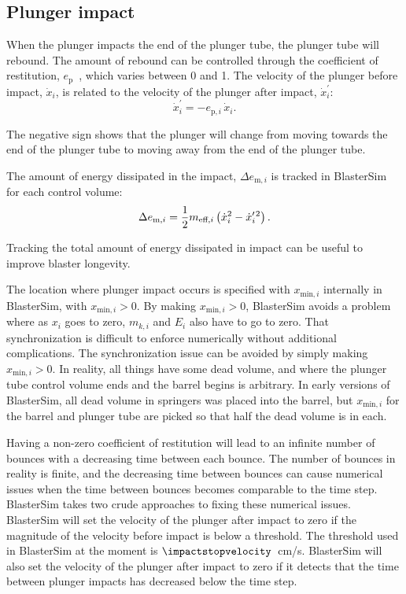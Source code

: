 \subsection{Plunger impact}\label{plunger-impact}

When the plunger impacts the end of the plunger tube, the plunger tube will rebound.
The amount of rebound can be controlled through the coefficient of restitution, $e_\text{p}$~\citep[pp.~524--525]{beer_vector_1962-1}, which varies between 0 and 1.
The velocity of the plunger before impact, $\dot{x}_i$, is related to the velocity of the plunger after impact, $\dot{x}_i^\prime$:
\begin{equation}
    \dot{x}_i^\prime = -e_{\text{p},i}\,\dot{x}_i.
\end{equation}

The negative sign shows that the plunger will change from moving towards the end of the plunger tube to moving away from the end of the plunger tube.

The amount of energy dissipated in the impact, $\Delta e_{\text{m},i}$ is tracked in BlasterSim for each control volume:
\begin{equation}
    \Delta e_{\text{m},i} = \frac{1}{2} m_{\text{eff},i} \left(\dot{x}_i^2 - \dot{x}_i^{\prime\kern1pt2}\right).
\end{equation}

Tracking the total amount of energy dissipated in impact can be useful to improve blaster longevity.

The location where plunger impact occurs is specified with $x_{\text{min},i}$ internally in BlasterSim, with $x_{\text{min},i} > 0$.
By making $x_{\text{min},i} > 0$, BlasterSim avoids a problem where as $x_i$ goes to zero, $m_{k,i}$ and $E_i$ also have to go to zero.
That synchronization is difficult to enforce numerically without additional complications.
The synchronization issue can be avoided by simply making $x_{\text{min},i} > 0$.
In reality, all things have some dead volume, and where the plunger tube control volume ends and the barrel begins is arbitrary.
In early versions of BlasterSim, all dead volume in springers was placed into the barrel, but $x_{\text{min},i}$ for the barrel and plunger tube are picked so that half the dead volume is in each.

Having a non-zero coefficient of restitution will lead to an infinite number of bounces with a decreasing time between each bounce.
The number of bounces in reality is finite, and the decreasing time between bounces can cause numerical issues when the time between bounces becomes comparable to the time step.
BlasterSim takes two crude approaches to fixing these numerical issues.
BlasterSim will set the velocity of the plunger after impact to zero if the magnitude of the velocity before impact is below a threshold.
The threshold used in BlasterSim at the moment is $\impactstopvelocity$~cm/s.
BlasterSim will also set the velocity of the plunger after impact to zero if it detects that the time between plunger impacts has decreased below the time step.

